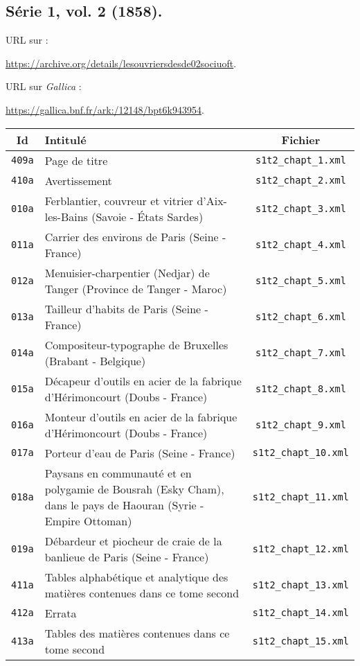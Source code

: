 \subsection{Série 1, vol. 2 (1858).}
\label{mappings1t2}

URL sur \ia{} : 

\url{https://archive.org/details/lesouvriersdesde02sociuoft}.

URL sur \textit{Gallica} : 

\url{https://gallica.bnf.fr/ark:/12148/bpt6k943954}.

\begin{center}
\begin{longtable}{ | c | p{9.5cm} | c | }
\hline
Id & Intitulé & Fichier \\ \hline
\texttt{409a} & Page de titre & \texttt{s1t2\_chapt\_1.xml} \\ \hline
\texttt{410a} & Avertissement & \texttt{s1t2\_chapt\_2.xml} \\ \hline
\texttt{010a} & Ferblantier, couvreur et vitrier d'Aix-les-Bains (Savoie - États Sardes) & \texttt{s1t2\_chapt\_3.xml} \\ \hline
\texttt{011a} & Carrier des environs de Paris (Seine - France) & \texttt{s1t2\_chapt\_4.xml} \\ \hline
\texttt{012a} & Menuisier-charpentier (Nedjar) de Tanger (Province de Tanger - Maroc) & \texttt{s1t2\_chapt\_5.xml} \\ \hline
\texttt{013a} & Tailleur d'habits de Paris (Seine - France) & \texttt{s1t2\_chapt\_6.xml} \\ \hline
\texttt{014a} & Compositeur-typographe de Bruxelles (Brabant - Belgique) & \texttt{s1t2\_chapt\_7.xml} \\ \hline
\texttt{015a} & Décapeur d'outils en acier de la fabrique d'Hérimoncourt (Doubs - France) & \texttt{s1t2\_chapt\_8.xml} \\ \hline
\texttt{016a} & Monteur d'outils en acier de la fabrique d'Hérimoncourt (Doubs - France) & \texttt{s1t2\_chapt\_9.xml} \\ \hline
\texttt{017a} & Porteur d'eau de Paris (Seine - France) & \texttt{s1t2\_chapt\_10.xml} \\ \hline
\texttt{018a} & Paysans en communauté et en polygamie de Bousrah (Esky Cham), dans le pays de Haouran (Syrie - Empire Ottoman) & \texttt{s1t2\_chapt\_11.xml} \\ \hline
\texttt{019a} & Débardeur et piocheur de craie de la banlieue de Paris (Seine - France) & \texttt{s1t2\_chapt\_12.xml} \\ \hline
\texttt{411a} & Tables alphabétique et analytique des matières contenues dans ce tome second & \texttt{s1t2\_chapt\_13.xml} \\ \hline
\texttt{412a} & Errata & \texttt{s1t2\_chapt\_14.xml} \\ \hline
\texttt{413a} & Tables des matières contenues dans ce tome second & \texttt{s1t2\_chapt\_15.xml} \\ \hline
\end{longtable}
\end{center}

